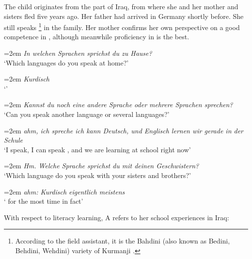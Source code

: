 \documentclass[output=paper,colorlinks,citecolor=brown]{langscibook}
\newenvironment{interview}{
  \setlength{\leftskip}{2.5em} %
  \setlength{\rightskip}{2.5em} %
  \setlength{\parindent}{0pt} %
  \vspace{\topsep} %
}{
  \vspace{\topsep} %
}
\newcommand{\speaker}[1]{%
  \noindent\hangindent=2em\makebox[1.5em][l]{#1:}\hspace{0.5em}%
}
\newcommand{\myattrib}[1]{%
    \attrib{#1}
}
\begin{document}
The child originates from the  part of Iraq, from where she and her mother and sisters fled five years ago. Her father had arrived in Germany shortly before. She still speaks \footnote{According to the  field assistant, it is the Bahdini (also known as Bedini, Behdini, Wehdini) variety of Kurmanji \citep[S. 287]{haig2019}.} in the family. Her mother confirms her own perspective on a good competence in , although meanwhile proficiency in  is the best.

\begin{interview}\label{ch2.5.ex.14}
\speaker{I}\textit{In welchen Sprachen sprichst du zu Hause?} \\
`Which languages do you speak at home?' 

\speaker{A}\textit{Kurdisch} \\
`' 

\speaker{I}\textit{Kannst du noch eine andere Sprache oder mehrere Sprachen sprechen?} \\
`Can you speak another language or several languages?' 

\speaker{A}\textit{ahm, ich spreche ich kann Deutsch, und Englisch lernen wir gerade in der Schule} \\
`I speak, I can speak , and we are learning  at school right now' 
\myattrib{Int 1\_A, 7--11}

\speaker{I}\textit{Hm. Welche Sprache sprichst du mit deinen Geschwistern?} \\
`Which language do you speak with your sisters and brothers?' 

\speaker{A}\textit{ahm: Kurdisch eigentlich meistens} \\
` for the most time in fact' 
\myattrib{Int 1\_A, 12--13}
\end{interview}

With respect to literacy learning, A refers to her school experiences in Iraq: 
\end{document}
